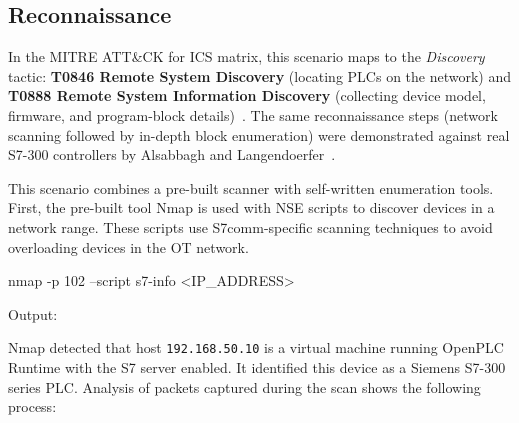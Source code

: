 ﻿\documentclass[../main.tex]{subfiles}
\begin{document}
\subsection{Reconnaissance}
\label{sec:reconnaissance}

In the MITRE ATT\&CK for ICS matrix, this scenario maps to the \emph{Discovery} tactic: \textbf{T0846 Remote System Discovery} (locating PLCs on the network) and \textbf{T0888 Remote System Information Discovery} (collecting device model, firmware, and program-block details)~\cite{mitre_ics_attack}. The same reconnaissance steps (network scanning followed by in-depth block enumeration) were demonstrated against real S7-300 controllers by Alsabbagh and Langendoerfer~\cite{alsabbagh2022remote}.

This scenario combines a pre-built scanner with self-written enumeration tools. First, the pre-built tool Nmap is used with NSE scripts to discover devices in a network range. These scripts use S7comm-specific scanning techniques to avoid overloading devices in the OT network.

\begin{packetdump}
nmap -p 102 --script s7-info <IP_ADDRESS>
\end{packetdump}

Output:



Nmap detected that host \texttt{192.168.50.10} is a virtual machine running OpenPLC Runtime with the S7 server enabled. It identified this device as a Siemens S7-300 series PLC. Analysis of packets captured during the scan shows the following process:
\end{document}
